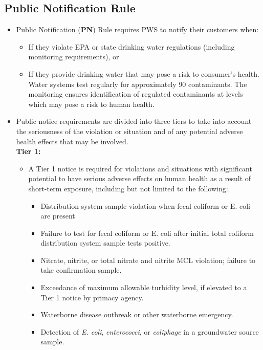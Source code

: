 \subsection{Public Notification Rule}
\begin{itemize}
\item Public Notification (\textbf{PN}) Rule requires PWS to notify their customers when:
\begin{itemize}
\item If they violate EPA or state drinking water regulations (including monitoring requirements), or 
\item If they provide drinking water that may pose a risk to consumer’s health.
Water systems test regularly for approximately 90 contaminants. The monitoring ensures identification of regulated contaminants at levels which may pose a risk to human health.
\end{itemize}
\item Public notice requirements are divided into three tiers to take into account the seriousness of the violation or situation and of any potential adverse health effects that may be involved.\\
\vspace{0.2cm}
\textbf{Tier 1:} \\
\begin{itemize}
\item A Tier 1 notice is required for violations and situations with significant potential to have serious adverse effects on human health as a result of short-term exposure, including but not limited to the following:.
\begin{itemize}
\item Distribution system sample violation when fecal coliform or E. coli are present
\item Failure to test for fecal coliform or E. coli after initial total coliform distribution system sample tests positive.
\item Nitrate, nitrite, or total nitrate and nitrite MCL  violation; failure to take confirmation	sample.
\item Exceedance of maximum allowable turbidity level, if elevated to a Tier 1 notice by primacy agency.
\item Waterborne disease outbreak or other waterborne emergency.
\item Detection of \textit{E. coli}, \textit{enterococci}, or \textit{coliphage} in a groundwater source sample.

\end{itemize}
\end{itemize}
\end{itemize}
